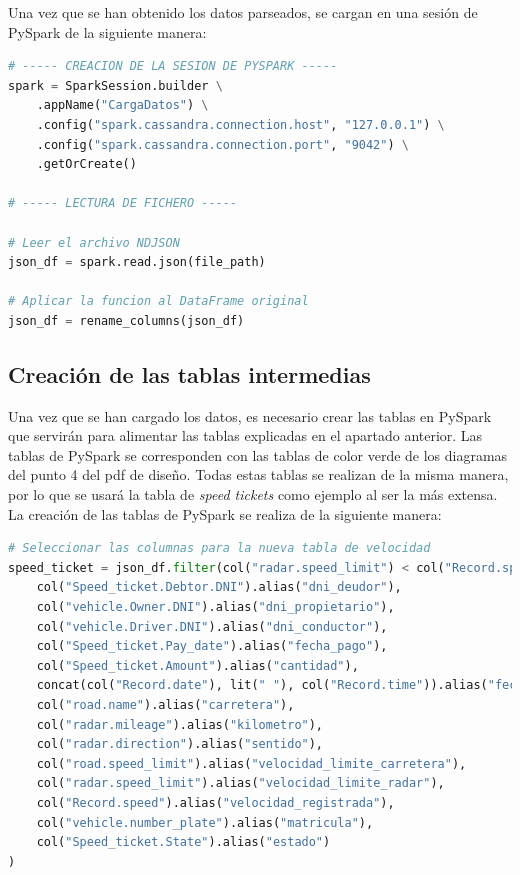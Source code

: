 \documentclass[]{article}
\begin{document}
Una vez que se han obtenido los datos parseados, se cargan en una sesión de PySpark de la siguiente manera:

\begin{lstlisting}[language=python, caption=Carga de datos en PySpark]
# ----- CREACION DE LA SESION DE PYSPARK -----
spark = SparkSession.builder \
    .appName("CargaDatos") \
    .config("spark.cassandra.connection.host", "127.0.0.1") \
    .config("spark.cassandra.connection.port", "9042") \
    .getOrCreate()

# ----- LECTURA DE FICHERO -----

# Leer el archivo NDJSON
json_df = spark.read.json(file_path)

# Aplicar la funcion al DataFrame original
json_df = rename_columns(json_df)
\end{lstlisting}

\subsection{Creación de las tablas intermedias}
Una vez que se han cargado los datos, es necesario crear las tablas en PySpark que servirán para alimentar las tablas explicadas en el apartado anterior. Las tablas de PySpark se corresponden con las tablas de color verde de los diagramas del punto 4 del pdf de diseño. Todas estas tablas se realizan de la misma manera, por lo que se usará la tabla de \textit{speed tickets} como ejemplo al ser la más extensa. La creación de las tablas de PySpark se realiza de la siguiente manera:

\begin{lstlisting}[language=python, caption=Creación de tablas en PySpark]
# Seleccionar las columnas para la nueva tabla de velocidad
speed_ticket = json_df.filter(col("radar.speed_limit") < col("Record.speed")).select(
    col("Speed_ticket.Debtor.DNI").alias("dni_deudor"),
    col("vehicle.Owner.DNI").alias("dni_propietario"),
    col("vehicle.Driver.DNI").alias("dni_conductor"),
    col("Speed_ticket.Pay_date").alias("fecha_pago"),
    col("Speed_ticket.Amount").alias("cantidad"),
    concat(col("Record.date"), lit(" "), col("Record.time")).alias("fecha_grabacion"),
    col("road.name").alias("carretera"),
    col("radar.mileage").alias("kilometro"),
    col("radar.direction").alias("sentido"),
    col("road.speed_limit").alias("velocidad_limite_carretera"),
    col("radar.speed_limit").alias("velocidad_limite_radar"),
    col("Record.speed").alias("velocidad_registrada"),
    col("vehicle.number_plate").alias("matricula"),
    col("Speed_ticket.State").alias("estado")
)
\end{lstlisting}
\end{document}
